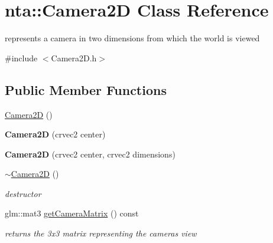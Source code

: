 \hypertarget{classnta_1_1Camera2D}{}\section{nta\+:\+:Camera2D Class Reference}
\label{classnta_1_1Camera2D}


represents a camera in two dimensions from which the world is viewed  




{\ttfamily \#include $<$Camera2\+D.\+h$>$}

\subsection*{Public Member Functions}
\begin{DoxyCompactItemize}
\item 
\hyperlink{classnta_1_1Camera2D_a11aada3f997c594ade11dd3c46d826f4}{Camera2D} ()
\item 
\mbox{\label{classnta_1_1Camera2D_a69171de8322165de5f134a83e33c419a}} 
{\bfseries Camera2D} (crvec2 center)
\item 
\mbox{\label{classnta_1_1Camera2D_af503a21cf73859010aefbacb1af7078c}} 
{\bfseries Camera2D} (crvec2 center, crvec2 dimensions)
\item 
\mbox{\label{classnta_1_1Camera2D_a18046ff230e055a06c6ca750e6eea8de}} 
\hyperlink{classnta_1_1Camera2D_a18046ff230e055a06c6ca750e6eea8de}{$\sim$\+Camera2D} ()
\begin{DoxyCompactList}\small\item\em destructor \end{DoxyCompactList}\item 
\mbox{\label{classnta_1_1Camera2D_a203daa81f32279e969de57a549165297}} 
glm\+::mat3 \hyperlink{classnta_1_1Camera2D_a203daa81f32279e969de57a549165297}{get\+Camera\+Matrix} () const
\begin{DoxyCompactList}\small\item\em returns the 3x3 matrix representing the camera\textquotesingle{}s view \end{DoxyCompactList}\item 
\mbox{\label{classnta_1_1Camera2D_ad02d4b9a995f3919c753fd2ea6d9f8f1}} 

\end{DoxyCompactItemize}
